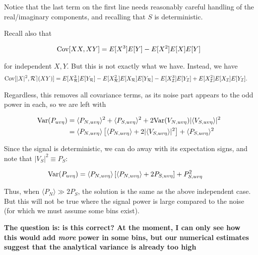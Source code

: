 \documentclass[11pt]{article}
\begin{document}
    Notice that the last term on the first line needs reasonably careful
handling of the real/imaginary components, and recalling that \(S\) is
deterministic.

    Recall also that

\begin{align}
{\rm Cov}[XX, XY] &= E[X^3]E[Y] - E[X^2]E[X]E[Y]  \\
\end{align}

for independent \(X,Y\). But this is not exactly what we have. Instead,
we have\\
\begin{align}
{\rm Cov}[|X|^2, \mathcal{Re} (XY)] &= E[X_\mathcal{R}^3]E[Y_\mathcal{R}] - E[X_\mathcal{R}^2]E[X_\mathcal{R}]E[Y_\mathcal{R}] -  E[X_\mathcal{I}^3]E[Y_\mathcal{I}] + E[X_\mathcal{I}^2]E[X_\mathcal{I}]E[Y_\mathcal{I}].
\end{align}

Regardless, this removes all covariance terms, as its noise part appears
to the odd power in each, so we are left with

\begin{align}
    {\rm Var}(P_{uv\eta}) &= \langle P_{N, uv\eta} \rangle^2 + \langle P_{S, uv\eta} \rangle^2 + 2{\rm Var}(V_{N,uv\eta})|\langle V_{S,uv\eta} \rangle|^2 \\
    &= \langle P_{N, uv\eta} \rangle \left[ \langle P_{N, uv\eta} \rangle + 2|\langle V_{S,uv\eta} \rangle|^2 \right] + \langle P_{S, uv\eta} \rangle^2
    \end{align}

    Since the signal is deterministic, we can do away with its expectation
signs, and note that \(|V_S|^2 \equiv P_S\):

\begin{align}
    {\rm Var}(P_{uv\eta}) &= \langle P_{N, uv\eta} \rangle \left[ \langle P_{N, uv\eta} \rangle + 2P_{S,uv\eta} \right] + P_{S, uv\eta}^2
    \end{align}

    Thus, when \(\langle P_N \rangle \gg 2 P_S\), the solution is the same
as the above independent case. But this will not be true where the
signal power is large compared to the noise (for which we must assume
some bins exist).

    \textbf{The question is: is this correct? At the moment, I can only see
how this would add \emph{more} power in some bins, but our numerical
estimates suggest that the analytical variance is already too high}


    
    
    
    
\end{document}
